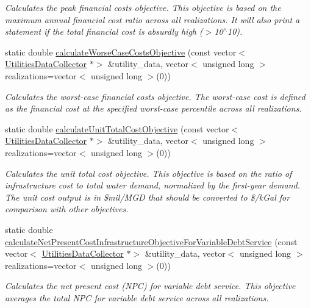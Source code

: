 \begin{DoxyCompactItemize}
\begin{DoxyCompactList}\small\item\em Calculates the peak financial costs objective. This objective is based on the maximum annual financial cost ratio across all realizations. It will also print a statement if the total financial cost is absurdly high ($>$10$^\wedge$10). \end{DoxyCompactList}\item 
static double \mbox{\hyperlink{classObjectivesCalculator_aaa5a9bb621c4346e106809f58afe1bd1}{calculate\+Worse\+Case\+Costs\+Objective}} (const vector$<$ \mbox{\hyperlink{classUtilitiesDataCollector}{Utilities\+Data\+Collector}} $\ast$$>$ \&utility\+\_\+data, vector$<$ unsigned long $>$ realizations=vector$<$ unsigned long $>$(0))
\begin{DoxyCompactList}\small\item\em Calculates the worst-\/case financial costs objective. The worst-\/case cost is defined as the financial cost at the specified worst-\/case percentile across all realizations. \end{DoxyCompactList}\item 
static double \mbox{\hyperlink{classObjectivesCalculator_a90547ef235596c39aa1bfe556d98b9f6}{calculate\+Unit\+Total\+Cost\+Objective}} (const vector$<$ \mbox{\hyperlink{classUtilitiesDataCollector}{Utilities\+Data\+Collector}} $\ast$$>$ \&utility\+\_\+data, vector$<$ unsigned long $>$ realizations=vector$<$ unsigned long $>$(0))
\begin{DoxyCompactList}\small\item\em Calculates the unit total cost objective. This objective is based on the ratio of infrastructure cost to total water demand, normalized by the first-\/year demand. The unit cost output is in \$mil/\+M\+GD that should be converted to \$/k\+Gal for comparison with other objectives. \end{DoxyCompactList}\item 
static double \mbox{\hyperlink{classObjectivesCalculator_aaf6480a2839ed67c9d5dd52d79e2954d}{calculate\+Net\+Present\+Cost\+Infrastructure\+Objective\+For\+Variable\+Debt\+Service}} (const vector$<$ \mbox{\hyperlink{classUtilitiesDataCollector}{Utilities\+Data\+Collector}} $\ast$$>$ \&utility\+\_\+data, vector$<$ unsigned long $>$ realizations=vector$<$ unsigned long $>$(0))
\begin{DoxyCompactList}\small\item\em Calculates the net present cost (N\+PC) for variable debt service. This objective averages the total N\+PC for variable debt service across all realizations. \end{DoxyCompactList}\end{DoxyCompactItemize}


